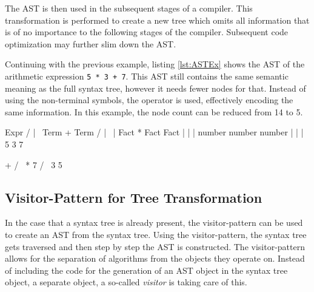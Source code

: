 The AST is then used in the subsequent stages of a compiler. This transformation is performed to create a new tree which omits all information that is of no importance to the following stages of the compiler. Subsequent code optimization may further slim down the AST. 

Continuing with the previous example, listing \ref{lst:ASTEx} shows the AST of the arithmetic expression \texttt{5 * 3 + 7}. This AST still contains the same semantic meaning as the full syntax tree, however it needs fewer nodes for that. Instead of using the non-terminal symbols, the operator is used, effectively encoding the same information. In this example, the node count can be reduced from 14 to 5.

\begin{GenericCode}[float,numbers=none,caption=Syntax tree of the arithmetic expression \texttt{5 * 3 + 7} based on the grammar in listing \ref{lst:Coco2ATG}., label=lst:SyntaxTreeEx]
                                       Expr   
                                   /    |    \
                                Term    +    Term
                              /   |   \        |    
                           Fact   *   Fact    Fact  
                            |          |       |
                          number     number  number
                            |          |       |
                            5          3       7
\end{GenericCode}

\begin{GenericCode}[float,numbers=none,caption=Abstract syntax tree of the arithmetic expression \texttt{5 * 3 + 7}., label=lst:ASTEx]
                                      +
                                    /   \
                                   *     7
                                 /   \
                                3     5
\end{GenericCode}

\subsection{Visitor-Pattern for Tree Transformation}

In the case that a syntax tree is already present, the visitor-pattern can be used to create an AST from the syntax tree. Using the visitor-pattern, the syntax tree gets traversed and then step by step the AST is constructed. The visitor-pattern allows for the separation of algorithms from the objects they operate on. Instead of including the code for the generation of an AST object in the syntax tree object, a separate object, a so-called \textit{visitor} is taking care of this. 

